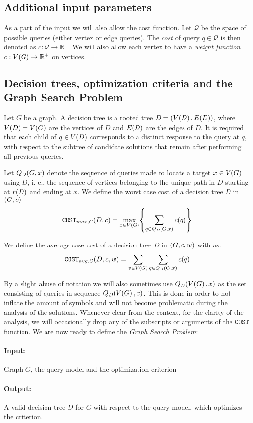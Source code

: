 \subsection{Additional input parameters}
As a part of the input we will also allow the cost function. Let $\mathcal{Q}$ be the space of possible queries (either vertex or edge queries). The \textit{cost} of query $q\in\mathcal{Q}$ is then denoted
as $c:\mathcal{Q}\to \mathbb{R}^+$. We will also allow each vertex to have a \textit{weight function} $c:V\mathopen{}\left( G \right)\to \mathbb{R}^+$ on vertices.
\subsection{Decision trees, optimization criteria and the Graph Search Problem}
Let $G$ be a graph. A decision tree is a rooted tree $D=(V\mathopen{}\left( D \right), E\mathopen{}\left( D \right))$, where $V\mathopen{}\left( D \right)=V\mathopen{}\left( G \right)$ are the vertices of $D$ and $E\mathopen{}\left( D \right)$ are the edges of $D$. It is required that each child of $q\in V\mathopen{}\left( D \right)$ corresponds to a distinct response to the query at $q$, with respect to the subtree of candidate solutions that remain after performing all previous queries. 

Let $Q_D\mathopen{}\left( G,x \right)$ denote the sequence of queries made to locate a target $x \in V\mathopen{}\left( G \right)$ using $D$, i. e., the sequence of vertices belonging to the unique path in $D$ starting at $r\mathopen{}\left( D \right)$ and ending at $x$. We define the worst case cost of a decision tree $D$ in $\mathopen{}\left( G,c \right)$
$$
\texttt{COST}_{max, G}\mathopen{}\left( D, c \right) = \max_{x\in V\mathopen{}\left( G \right)} \mathopen{}\left\{ \sum_{q\in Q_D\mathopen{}\left( G, x \right)}c\mathopen{}\left( q \right) \right\}
$$

We define the average case cost of a decision tree $D$ in $\mathopen{}\left( G,c,w \right)$ with as:
$$
\texttt{COST}_{avg, G}\mathopen{}\left( D, c, w \right) = \sum_{v\in V\mathopen{}\left( G \right)}\sum_{q\in Q_D\mathopen{}\left( G,x \right)}c\mathopen{}\left( q \right)
$$

By a slight abuse of notation we will also sometimes use $Q_D\mathopen{}\left( V\mathopen{}\left( G \right),x \right)$ as the set consisting of queries in sequence $Q_D\mathopen{}\left( V\mathopen{}\left( G \right),x \right)$. This is done in order to not inflate the amount of symbols and will not become problematic during the analysis of the solutions.
Whenever clear from the context, for the clarity of the analysis, we will occasionally drop any of the subscripts or arguments of the $\texttt{COST}$ function.
We are now ready to define the \textit{Graph Search Problem}:

\begin{tcolorbox}[colback=white, title=Generalized Search Problem, fonttitle=\bfseries, breakable]
\paragraph{Input:} Graph $G$, the query model and the optimization criterion
\paragraph{Output:} A valid decision tree $D$ for $G$ with respect to the query model, which optimizes the criterion.
\end{tcolorbox}